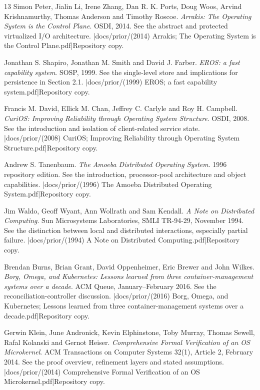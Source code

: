 \begin{thebibliography}{13}
Simon Peter, Jialin Li, Irene Zhang, Dan R. K. Ports, Doug Woos,
Arvind Krishnamurthy, Thomas Anderson and Timothy Roscoe.
\emph{Arrakis: The Operating System is the Control Plane}. OSDI, 2014.
See the abstract and protected virtualized I/O architecture.
\repofiletext|docs/prior/(2014) Arrakis; The Operating System is the Control Plane.pdf|{Repository copy.}

Jonathan S. Shapiro, Jonathan M. Smith and David J. Farber.
\emph{EROS: a fast capability system}. SOSP, 1999.
See the single-level store and implications for persistence in Section 2.1.
\repofiletext|docs/prior/(1999) EROS; a fast capability system.pdf|{Repository copy.}

Francis M. David, Ellick M. Chan, Jeffrey C. Carlyle and Roy H. Campbell.
\emph{CuriOS: Improving Reliability through Operating System Structure}.
OSDI, 2008. See the introduction and isolation of client-related service state.
\repofiletext|docs/prior/(2008) CuriOS; Improving Reliability through Operating System Structure.pdf|{Repository copy.}

Andrew S. Tanenbaum. \emph{The Amoeba Distributed Operating System}.
1996 repository edition. See the introduction, processor-pool architecture
and object capabilities.
\repofiletext|docs/prior/(1996) The Amoeba Distributed Operating System.pdf|{Repository copy.}

Jim Waldo, Geoff Wyant, Ann Wollrath and Sam Kendall.
\emph{A Note on Distributed Computing}. Sun Microsystems Laboratories,
SMLI TR-94-29, November 1994. See the distinction between local and
distributed interactions, especially partial failure.
\repofiletext|docs/prior/(1994) A Note on Distributed Computing.pdf|{Repository copy.}

Brendan Burns, Brian Grant, David Oppenheimer, Eric Brewer and John Wilkes.
\emph{Borg, Omega, and Kubernetes: Lessons learned from three
container-management systems over a decade}. ACM Queue, January--February
2016. See the reconciliation-controller discussion.
\repofiletext|docs/prior/(2016) Borg, Omega, and Kubernetes; Lessons learned from three container-management systems over a decade.pdf|{Repository copy.}

Gerwin Klein, June Andronick, Kevin Elphinstone, Toby Murray, Thomas Sewell,
Rafal Kolanski and Gernot Heiser.
\emph{Comprehensive Formal Verification of an OS Microkernel}.
ACM Transactions on Computer Systems 32(1), Article 2, February 2014.
See the proof overview, refinement layers and stated assumptions.
\repofiletext|docs/prior/(2014) Comprehensive Formal Verification of an OS Microkernel.pdf|{Repository copy.}

\end{thebibliography}
